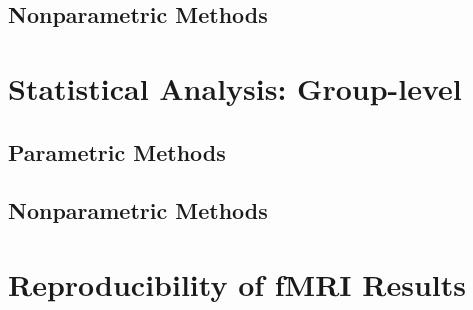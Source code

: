 \subsection{Nonparametric Methods}

\section{Statistical Analysis: Group-level}

\subsection{Parametric Methods}

\subsection{Nonparametric Methods}

\section{Reproducibility of fMRI Results}


